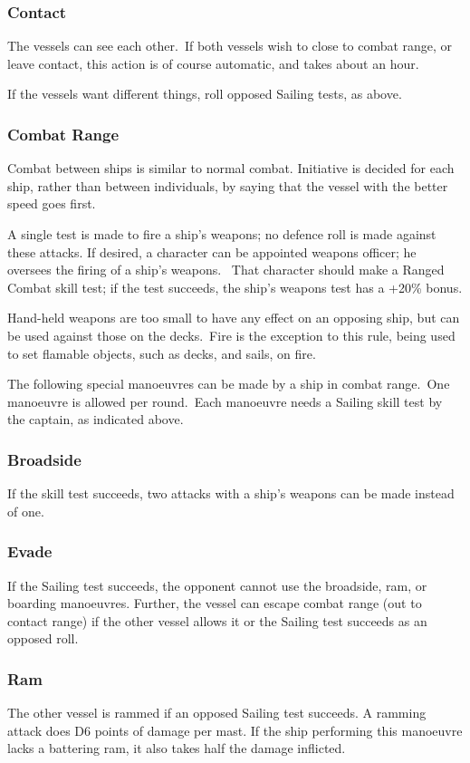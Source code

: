 \subsubsection{Contact}
The vessels can see each other. If both vessels wish to close to combat range, or leave contact, this action is of course automatic, and takes about an hour.

If the vessels want different things, roll opposed Sailing tests, as above.

\subsubsection{Combat Range}
Combat between ships is similar to normal combat. Initiative is decided for each ship, rather than between individuals, by saying that the vessel with the better speed goes first.  

A single test is made to fire a ship’s weapons; no defence roll is made against these attacks. If desired, a character can be appointed weapons officer; he oversees the firing of a ship’s weapons.  That character should make a Ranged Combat skill test; if the test succeeds, the ship’s weapons test has a +20\% bonus.

Hand-held weapons are too small to have any effect on an opposing ship, but can be used against those on the decks. Fire is the exception to this rule, being used to set flamable objects, such as decks, and sails, on fire.

The following special manoeuvres can be made by a ship in combat range. One manoeuvre is allowed per round. Each manoeuvre needs a Sailing skill test by the captain, as indicated above.

\subsubsection{Broadside}
If the skill test succeeds, two attacks with a ship’s weapons can be made instead of one.


\subsubsection{Evade}
If the Sailing test succeeds, the opponent cannot use the broadside, ram, or boarding manoeuvres. Further, the vessel can escape combat range (out to contact range) if the other vessel allows it or the Sailing test succeeds as an opposed roll.


\subsubsection{Ram}
The other vessel is rammed if an opposed Sailing test succeeds. A ramming attack does D6 points of damage per mast. If the ship performing this manoeuvre lacks a battering ram, it also takes half the damage inflicted.


